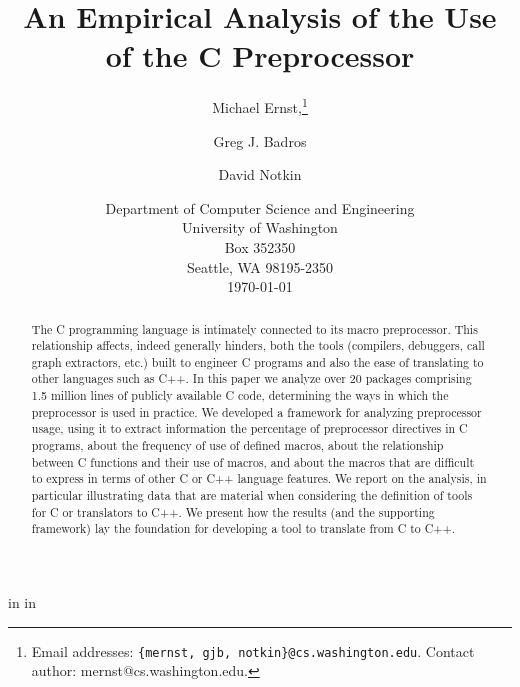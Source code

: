 
\marginparwidth 0pt
\oddsidemargin  0pt
\evensidemargin 0pt
\marginparsep 0pt

\topmargin   0pt

 in
 in




\title{An Empirical Analysis of the Use of the C Preprocessor}

\author{Michael Ernst,\thanks{Email 
addresses: {\tt \{mernst, gjb, notkin\}@cs.washington.edu}.  Contact author:
mernst@cs.washington.edu.}
\and Greg J. Badros \and David Notkin}


\date{Department of Computer
Science and Engineering
\\University 
of Washington\\
Box 352350\\
Seattle, WA  98195-2350\\
\today}  

\maketitle


\begin{abstract}

The C programming language is intimately connected to its macro
preprocessor.  This relationship affects, indeed generally hinders,
both the tools (compilers, debuggers, call graph extractors, etc.)
built to engineer C programs and also the ease of translating to other
languages such as C++.  In this paper we analyze over 20 packages
comprising 1.5 million lines of publicly available C code, determining
the ways in which the preprocessor is used in practice.  We developed
a framework for analyzing preprocessor usage, using it to extract
information the percentage of preprocessor directives in C programs,
about the frequency of use of defined macros, about the relationship
between C functions and their use of macros, and about the macros that
are difficult to express in terms of other C or C++ language features.
We report on the analysis, in particular illustrating data that are
material when considering the definition of tools for C or translators
to C++.  We present how the results (and the supporting framework) lay
the foundation for developing a tool to translate from C to C++.

\end{abstract}

